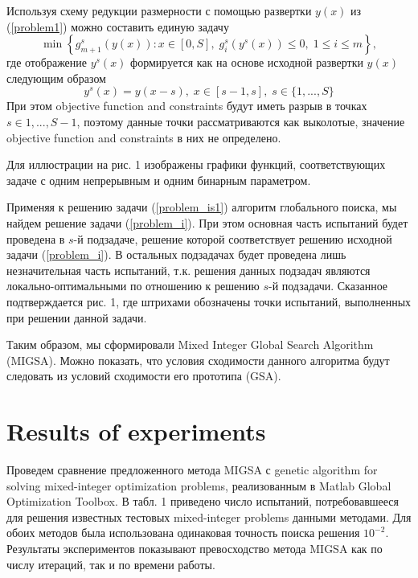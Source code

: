 \documentclass{llncs}
\begin{document}
Используя схему редукции размерности с помощью развертки $y(x)$ из (\ref{problem1}) можно составить единую задачу
\begin{equation}\label{problem_is1}
\min \left\{g_{m+1}^s(y(x)): x \in [0,S], \; g_i^s(y^s(x)) \leq 0, \; 1 \leq i \leq m\right\},
\end{equation}
где отображение $y^s(x)$  формируется как на основе исходной развертки $y(x)$ следующим образом
\[
y^s(x)=y(x-s), \; x\in[s-1,s],\; s\in\{1,...,S\}
\]
При этом objective function and constraints будут иметь разрыв в точках $s∈{1,...,S-1}$, поэтому данные точки рассматриваются как выколотые, значение objective function and constraints в них не определено.

Для иллюстрации на рис. 1 изображены графики функций, соответствующих задаче с одним непрерывным и одним бинарным параметром.


Применяя к решению задачи (\ref{problem_is1}) алгоритм глобального поиска, мы найдем решение задачи (\ref{problem_i}). При этом основная часть испытаний будет проведена в $s$-й подзадаче, решение которой соответствует решению исходной задачи (\ref{problem_i}). В остальных подзадачах будет проведена лишь незначительная часть испытаний, т.к. решения данных подзадач являются локально-оптимальными по отношению к решению $s$-й подзадачи. Сказанное подтверждается рис. 1, где штрихами обозначены точки испытаний, выполненных при решении данной задачи.

Таким образом, мы сформировали Mixed Integer Global Search Algorithm (MIGSA). Можно показать, что условия сходимости данного алгоритма будут следовать из условий сходимости его прототипа (GSA).

\section{Results of experiments}

\Russian
Проведем сравнение предложенного метода MIGSA с genetic algorithm for solving mixed-integer optimization problems, реализованным в Matlab Global Optimization Toolbox. В табл. 1 приведено число испытаний, потребовавшееся для решения известных тестовых mixed-integer problems данными методами. Для обоих методов была использована одинаковая точность поиска решения $10^{-2}$. Результаты экспериментов показывают превосходство метода MIGSA как по числу итераций, так и по времени работы.
\end{document}
